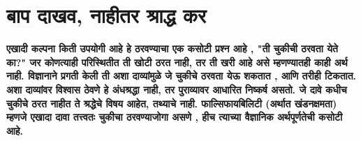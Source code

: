 \chapter{बाप दाखव, नाहीतर श्राद्ध कर}

\textcolor{blue!60!black}{\textbf{एखादी कल्पना किती उपयोगी आहे हे ठरवण्याचा एक कसोटी प्रश्न आहे , "ती चुकीची ठरवता येते का?" जर कोणत्याही परिस्थितीत ती खोटी ठरत नाही, तर ती खरी आहे असे म्हणण्यातही काही अर्थ नाही. विज्ञानाने प्रगती केली ती अशा दाव्यांमुळे जे चुकीचे ठरवता येऊ शकतात , आणि तरीही टिकतात. अशा दाव्यांवर विश्वास ठेवणे हे अंधश्रद्धा नाही, तर पुराव्यावर आधारित निष्कर्ष असतो. जे दावे कधीच चुकीचे ठरत नाहीत ते श्रद्धेचे विषय आहेत, तथ्याचे नाही. फाल्सिफायबिलिटी (अर्थात खंडनक्षमता) म्हणजे एखादा दावा तत्त्वतः चुकीचा ठरवण्याजोगा असणे , हीच त्याच्या वैज्ञानिक अर्थपूर्णतेची कसोटी आहे.}}

